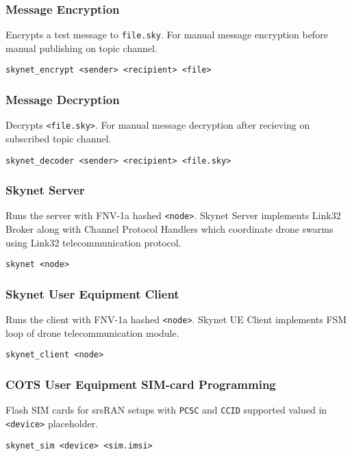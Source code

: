 \documentclass{article}
\begin{document}
\subsubsection*{Message Encryption}
Encrypts a test message to \texttt{file.sky}.
For manual message encryption before manual publishing on topic channel.
\begin{lstlisting}
skynet_encrypt <sender> <recipient> <file>
\end{lstlisting}

\subsubsection*{Message Decryption}
Decrypts \texttt{<file.sky>}.
For manual message decryption after recieving on subscribed topic channel.
\begin{lstlisting}
skynet_decoder <sender> <recipient> <file.sky>
\end{lstlisting}

\subsubsection*{Skynet Server}
Runs the server with FNV-1a hashed \texttt{<node>}.
Skynet Server implements Link32 Broker along with Channel Protocol Handlers
which coordinate drone swarms using Link32 telecommunication protocol.
\begin{lstlisting}
skynet <node>
\end{lstlisting}

\subsubsection*{Skynet User Equipment Client}
Runs the client with FNV-1a hashed \texttt{<node>}.
Skynet UE Client implements FSM loop of drone telecommunication module.
\begin{lstlisting}
skynet_client <node>
\end{lstlisting}

\subsubsection*{COTS User Equipment SIM-card Programming}
Flash SIM cards for srsRAN setups with \texttt{PCSC} and \texttt{CCID} supported valued in \texttt{<device>} placeholder.
\begin{lstlisting}
skynet_sim <device> <sim.imsi>
\end{lstlisting}
\end{document}
